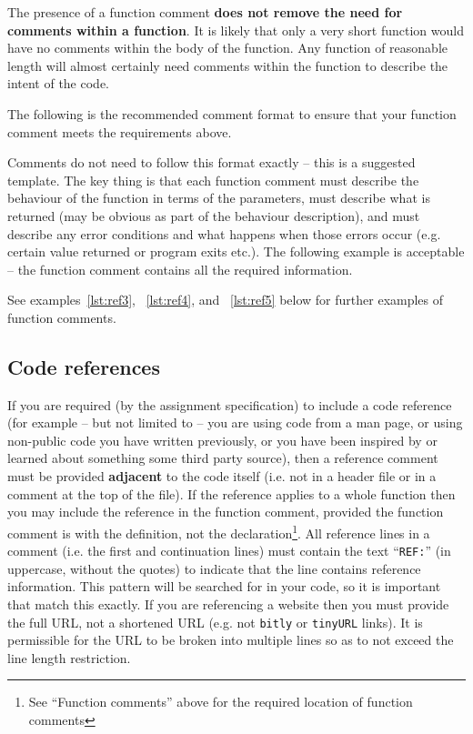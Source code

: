 \documentclass{article}
\newcommand{\icon}[1]{\raisebox{-3pt}{\texttt{[image: icons/\#1.png]}}}
\begin{document}
The presence of a function comment \textbf{does not remove the need for comments within a function}. It is likely that only a very short
function would have no comments within the body of the function. Any function of reasonable length will almost certainly need
comments within the function to describe the intent of the code.

The following is the recommended comment format to ensure that your function comment meets the requirements above.

\nolinenumbers
{}

\linenumbers

Comments do not need to follow this format exactly -- this is a suggested template. The key thing is that each function comment 
must describe the behaviour of the function in terms of the parameters, must describe what is returned (may be obvious as 
part of the behaviour description), and must describe any error conditions and what happens when those errors occur (e.g.
certain value returned or program exits etc.). The following example is acceptable -- the function comment contains all 
the required information.

\nolinenumbers
{}

\linenumbers

See examples~\ref{lst:ref3}, ~\ref{lst:ref4}, and ~\ref{lst:ref5}  below for further examples of function comments.

\subsection{Code references\texorpdfstring{\protect\hfill\icon{MANUAL-CHECK}}{}}
If you are required (by the assignment specification) 
to include a code reference (for example -- but not limited to -- you are using code from a man page, or using non-public code you have 
written previously, or you have been inspired by or learned about something some third party source), then a reference comment must be provided
\textbf{adjacent} to the code itself (i.e. not in a header file or in a comment at the top of the file). If the reference applies to a whole
function then you may include the reference in the function comment, provided the function comment is with the definition, not the declaration\footnote{See ``Function comments'' above for the required location of function comments}. All reference lines 
in a comment (i.e. the first and continuation lines) must contain the text ``\texttt{REF:}'' (in uppercase, 
without the quotes) to indicate that the line contains reference information. This pattern will be searched for in your code, so it is important that match this exactly. If you are referencing a website then you must provide the full URL, not a shortened URL (e.g. not \texttt{bitly} or \texttt{tinyURL} links). 
It is permissible for the URL to be broken into multiple lines so as to not exceed the line length restriction.
\end{document}
